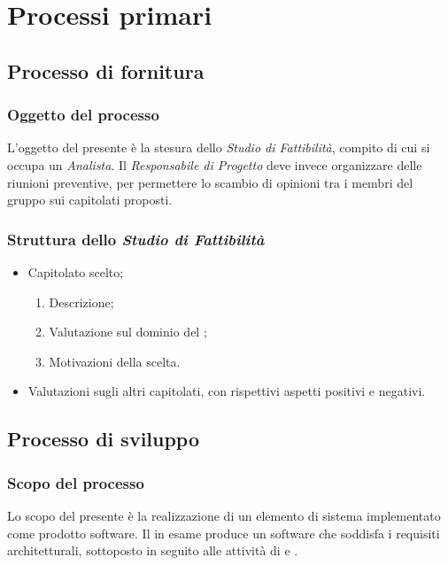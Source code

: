 \section{Processi primari}

	\subsection{Processo di fornitura}	
	\subsubsection{Oggetto del processo}
	L'oggetto del presente  è la stesura dello \textit{Studio di Fattibilità}, compito
	di cui si occupa un \textit{Analista}. Il \textit{Responsabile di Progetto} deve invece organizzare delle riunioni preventive, 
	per permettere lo scambio di opinioni tra i membri del gruppo sui capitolati proposti.
	\subsubsection{Struttura dello \textit{Studio di Fattibilità}}
		\begin{itemize}
			\item Capitolato scelto;
				\begin{enumerate}
					\item Descrizione;
					\item Valutazione sul dominio del ;
					\item Motivazioni della scelta.
				\end{enumerate}	
			\item Valutazioni sugli altri capitolati, con rispettivi aspetti positivi e negativi.
		\end{itemize}

	\subsection{Processo di sviluppo}
        \subsubsection{Scopo del processo}
        Lo scopo del presente  \`e la realizzazione di un elemento di sistema implementato come prodotto
        software. Il  in esame produce un software che soddisfa i requisiti architetturali, sottoposto
        in seguito alle attivit\`a di  e .
        
